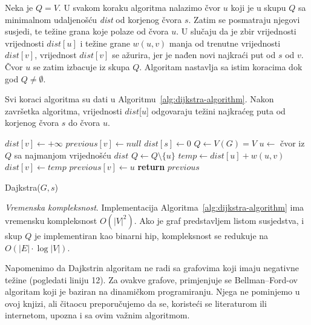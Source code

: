 \documentclass[a4paper, utf8, 11pt, colorlinks]{book}
\theoremstyle{definition}
\begin{document}
Neka je $Q = V$.  
U svakom koraku algoritma nalazimo čvor $u$ koji je u skupu $Q$ sa minimalnom udaljenošću \emph{dist} od korjenog čvora $s$. Zatim se posmatraju njegovi susjedi, te težine grana koje polaze od čvora $u$. U slučaju da je zbir vrijednosti vrijednosti $dist[u]$  i težine grane $w(u,v)$ manja od trenutne vrijednosti $dist[v]$, vrijednost $dist[v]$ se ažurira, jer je nađen novi najkraći put od $s$ od $v$.  Čvor $u$ se zatim izbacuje iz skupa $Q$. Algoritam nastavlja sa istim koracima dok god $Q \neq \emptyset$. 

Svi koraci algoritma su dati u Algoritmu~\ref{alg:dijkstra-algorithm}. Nakon završetka algoritma, vrijednosti $dist$[$u$] odgovaraju težini najkraćeg puta od korjenog čvora $s$ do čvora $u$. 


\begin{algorithm}[!ht]
	\begin{algorithmic}[1]
	      	\STATE   $dist[v] \gets +\infty$ 	%
		    \STATE $previous[v] \gets null$ 	%
		\ENDFOR
		\STATE	$dist[s] \gets 0$ 	 
		\STATE	$Q \gets V(G)=V$
		\STATE $u \gets$ čvor iz $Q$ sa najmanjom vrijednošću $dist$
		\STATE $Q \gets Q \setminus \{u\}$
		\STATE $temp \gets dist[u] + w(u, v)$
		\STATE  $dist[v] \gets temp$
		\STATE $previous[v] \gets u$ 
		\ENDIF
		\ENDFOR
		\ENDWHILE
		\STATE	\textbf{return} $previous$ 
	\end{algorithmic}
    		\caption{Dajkstra($G,s $)}\label{alg:dijkstra-algorithm}
\end{algorithm}

\emph{Vremenska kompleksnost}.  Implementacija Algoritma~\ref{alg:dijkstra-algorithm} ima vremensku kompleksnost $O(|V|^2)$. Ako je graf predstavljem listom susjedstva, i skup $Q$  je implementiran kao binarni hip, 
kompleksnost se redukuje na $O(|E| \cdot \log |V|)$.

Napomenimo da Dajkstrin algoritam ne radi sa grafovima koji imaju negativne težine (pogledati  liniju 12).  Za ovakve grafove,  primjenjuje se Bellman–Ford-ov algoritam koji je baziran na dinamičkom programiranju. Njega ne pominjemo   u ovoj knjizi, ali čitaocu preporučujemo da se, koristeći se literaturom ili internetom, upozna i sa ovim važnim algoritmom.  %

\end{document}
